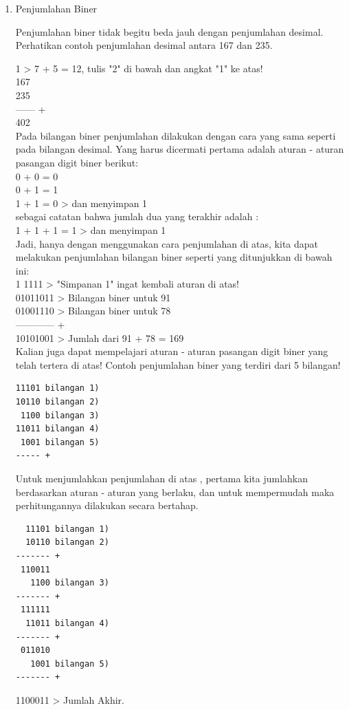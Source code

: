 \begin{enumerate}[label=(\alph*)]
\begin{enumerate}

\item Penjumlahan Biner

\qquad Penjumlahan biner tidak begitu beda jauh dengan penjumlahan desimal. Perhatikan contoh penjumlahan desimal antara 167 dan 235.

1 > 7 + 5 = 12, tulis "2" di bawah dan angkat "1" ke atas! \\

167 \\
235 \\
------ + \\
402 \\

\qquad Pada bilangan biner penjumlahan dilakukan dengan cara yang sama seperti pada bilangan desimal. Yang harus dicermati pertama adalah aturan - aturan pasangan digit biner berikut:\\
0 + 0 = 0 \\
0 + 1 = 1 \\
1 + 1 = 0 > dan menyimpan 1 \\

sebagai catatan bahwa jumlah dua yang terakhir adalah : \\
1 + 1 + 1 = 1 > dan menyimpan 1 \\

\qquad Jadi, hanya dengan menggunakan cara penjumlahan di atas, kita dapat melakukan penjumlahan bilangan biner seperti yang ditunjukkan di bawah ini: \\
1 1111 > "Simpanan 1" ingat kembali aturan di atas! \\
01011011 > Bilangan biner untuk 91 \\
01001110 > Bilangan biner untuk 78 \\
------------ + \\
10101001 > Jumlah dari 91 + 78 = 169 \\

\qquad Kalian juga dapat mempelajari aturan - aturan pasangan digit biner yang telah tertera di atas! Contoh penjumlahan biner yang terdiri dari 5 bilangan!\\
\begin{verbatim}
11101 bilangan 1)
10110 bilangan 2) 
 1100 bilangan 3)
11011 bilangan 4)
 1001 bilangan 5)
----- +
\end{verbatim}

\qquad Untuk menjumlahkan penjumlahan di atas , pertama kita jumlahkan berdasarkan aturan - aturan yang berlaku, dan untuk mempermudah maka perhitungannya dilakukan secara bertahap. \\
\begin{verbatim}
  11101 bilangan 1)
  10110 bilangan 2)
------- +
 110011
   1100 bilangan 3)
------- +
 111111
  11011 bilangan 4)
------- +
 011010
   1001 bilangan 5)
------- +
\end{verbatim}
1100011 > Jumlah Akhir. \\


\end{enumerate}
\end{enumerate}
